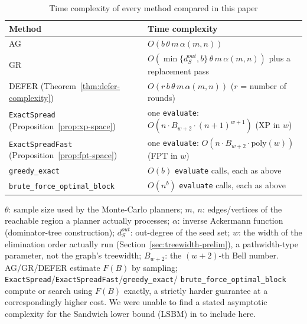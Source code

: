\documentclass[ASNA,number]{USG}
\newcommand{\up}{\rule{0pt}{2.6ex}}
\newcommand{\down}{\rule[-1.2ex]{0pt}{0pt}}
\newcommand{\FF}{F}
\begin{document}
\begin{table}[h]
\centering
\caption{Time complexity of every method compared in this paper\label{tab:complexity}}
\begin{tabular}{@{}ll@{}}
\hline
\up Method & Time complexity \\
\hline
\up AG \citep{xie2024} & $O(b\,\theta\,m\,\alpha(m,n))$ \\
GR \citep{xie2024} & $O(\min\{d^{out}_S,b\}\,\theta\,m\,\alpha(m,n))$ plus a replacement pass \\
DEFER (Theorem~\ref{thm:defer-complexity}) & $O(r\,b\,\theta\,m\,\alpha(m,n))$ ($r$ = number of rounds) \\
\texttt{ExactSpread} (Proposition~\ref{prop:xp-space}) & one \texttt{evaluate}: $O(n\cdot B_{w+2}\cdot(n+1)^{w+1})$ (XP in $w$) \\
\texttt{ExactSpreadFast} (Proposition~\ref{prop:fpt-space}) & one \texttt{evaluate}: $O(n\cdot B_{w+2}\cdot\mathrm{poly}(w))$ (FPT in $w$) \\
\texttt{greedy\_exact} & $O(b)$ \texttt{evaluate} calls, each as above \\
\down \texttt{brute\_force\_optimal\_block} & $O(n^b)$ \texttt{evaluate} calls, each as above \\
\hline
\end{tabular}
$\theta$: sample size used by the Monte-Carlo planners; $m$, $n$:
edges/vertices of the reachable region a planner actually processes;
$\alpha$: inverse Ackermann function (dominator-tree construction);
$d^{out}_S$: out-degree of the seed set; $w$: the width of the elimination
order actually run (Section~\ref{sec:treewidth-prelim}), a pathwidth-type
parameter, not the graph's treewidth; $B_{w+2}$: the
$(w+2)$-th Bell number. AG/GR/DEFER estimate $\FF(B)$ by sampling;
\texttt{ExactSpread}/\texttt{ExactSpreadFast}/\texttt{greedy\_exact}/
\texttt{brute\_force\_optimal\_block} compute or search using $\FF(B)$
exactly, a strictly harder guarantee at a correspondingly higher cost. We
were unable to find a stated asymptotic complexity for the Sandwich lower
bound (LSBM) in \citet{wang2024sandwich} to include here.
\end{table}
\end{document}
